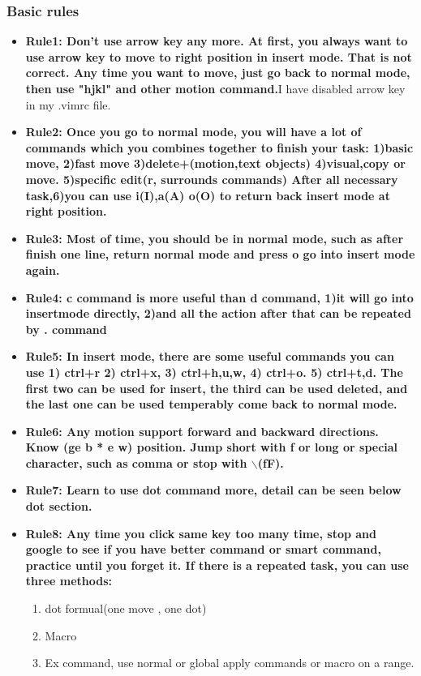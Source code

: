 \documentclass[a4paper,11pt,twoside]{book}
\begin{document}
\subsubsection{Basic rules}
\begin{itemize}

		\item \textbf{Rule1: Don't use arrow key any more. At first, you always want to use arrow key to move to right position in insert mode. That is not correct. Any time you want to move, just go back to normal mode, then use "hjkl" and other motion command.}I have disabled arrow key in my .vimrc file.

		\item \textbf{Rule2: Once you go to normal mode, you will have a lot of commands which you combines together to finish your task: 1)basic move, 2)fast move 3)delete+(motion,text objects) 4)visual,copy or move. 5)specific edit(r, surrounds commands) After all necessary task,6)you can use i(I),a(A) o(O) to return back insert mode at right position.} 

		\item  \textbf{Rule3: Most of time, you should be in normal mode,  such as after finish one line, return normal mode and press o go into insert mode again.} 

		\item \textbf{Rule4: c command is more useful than d command, 1)it will go into insertmode directly, 2)and all the action after that can be repeated by . command}

		\item \textbf{Rule5: In insert mode, there are some useful commands you can use 1) ctrl+r 2) ctrl+x, 3) ctrl+h,u,w, 4) ctrl+o. 5) ctrl+t,d. The first two can be used for insert, the third can be used deleted, and the last one can be used temperably come back to normal mode.}
\item \textbf{Rule6: Any motion support forward and backward directions. Know (ge b * e w) position. Jump short with f or long or special character, such as comma or stop with $\backslash$(fF).}

		\item \textbf{Rule7: Learn to use dot command more, detail can be seen below dot section.}

		\item \textbf{Rule8: Any time you click same key too many time, stop and google to see if you have better command or smart command, practice until you forget it. If there is a repeated task, you can use three methods:}
            \begin{enumerate}
                \item dot formual(one move , one dot)
                \item Macro 
                \item Ex command, use normal or global apply commands or macro on a range.
            \end{enumerate}


\end{itemize}
\end{document}
